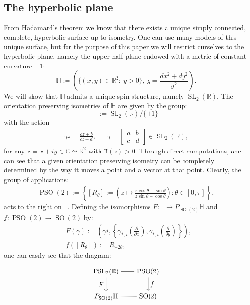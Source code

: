 \documentclass[12pt]{amsart}
\theoremstyle{definition}
\def\RR{{\mathbb R}}
\def\CC{{\mathbb C}}
\def\HH{{\mathbb{H}}}
\def\g{{\gamma}}
\DeclareMathOperator{\psl}{PSL_2(\mathbb{R})}
\newcommand{\slinear}{\operatorname{SL}}
\newcommand{\so}{\operatorname{SO}}
\newcommand{\pso}{\operatorname{PSO}}
\begin{document}
\subsection{The hyperbolic plane}
From Hadamard's theorem we know that there exists a unique simply connected, complete, hyperbolic surface up to isometry. One can use many models of this unique surface, but for the purpose of this paper we will restrict ourselves to the hyperbolic plane, namely the upper half plane endowed with a metric of constant curvature $-1$:
\[
\HH := \left( \{ (x,y)\in \RR^2 : \ y>0 \}, \ g=\frac{dx^2+ dy^2}{y^2} \right).
\]
We will show that $\HH$ admits a unique spin structure, namely $\slinear_2(\RR)$. The orientation preserving isometries of $\HH$ are given by the group: \[
\psl := \slinear_2(\RR) / \{\pm 1 \}
\] 
with the action:
\begin{align*}
\g z = \frac{az+b}{cz+d}, && \g= \begin{bmatrix} a & b \\
                                                                                  c & d   \end{bmatrix} \in \slinear_2(\RR),
\end{align*}
for any $z = x+iy\in \CC \simeq \RR^2$ with $\Im (z) >0$. Through direct computations, one can see that a given orientation preserving isometry can be completely determined by the way it moves a point and a vector at that point. Clearly, the group of applications:
\begin{align*}
\pso(2):=\left\lbrace [R_{\theta}]:= \left( z  \mapsto \frac{z\cos \theta - \sin \theta}{z\sin \theta + \cos \theta} \right) : \theta \in [0, \pi] \right\rbrace,
\end{align*}
acts to the right on $\psl$. Defining the isomorphisms $F:\psl \longrightarrow P_{\so(2)}\HH$ and $f:\pso(2) \longrightarrow \so(2)$ by:
\begin{align*}
&F(\g)
:=
\left( \g i, \left\{ \g_{*,i} \left( \frac{\partial}{\partial x} \right) ,\g_{*,i} \left( \frac{\partial}{\partial y} \right) \right\} \right), \\
&f([R_{\theta}])
:=
R_{-2\theta},
\end{align*}
one can easily see that the diagram:
\begin{equation*}
\begin{tikzpicture}[baseline=(current  bounding  box.center)]
  \matrix (m) [matrix of math nodes,row sep=2em,column sep=2em,minimum width=2em]
  {
      \psl & \pso(2) \\
      P_{\so(2)}\HH & \so(2) \\
  };
  \path
    (m-1-1) edge node [ above] {} (m-1-2)
    (m-2-1)	edge node [below] {} (m-2-2);
    
    
  \path[->] 
  	(m-1-1) edge node [left] {$F$} (m-2-1)
  	(m-1-2)	edge node [right] {$f$} (m-2-2);
\end{tikzpicture}
\end{equation*}
\end{document}
